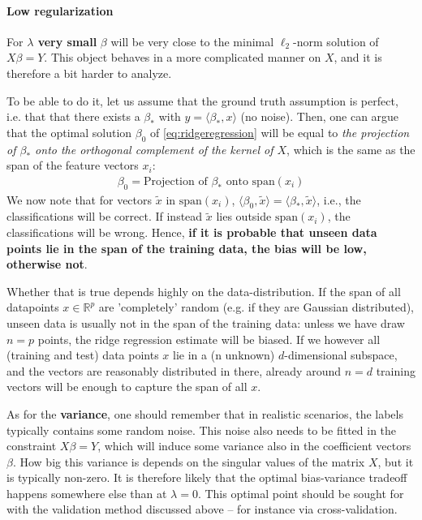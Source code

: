 \documentclass{article}
\newcommand{\sprod}[1]{\langle #1 \rangle}
\newcommand{\R}{\mathbb{R}}
\begin{document}
\paragraph{Low regularization} For \textbf{$\lambda$ very small} $\beta$ will be very close to the minimal $\ell_2$-norm solution of $X\beta = Y$. This object behaves in a more complicated manner on $X$, and it is therefore a bit harder to analyze.

To be able to do it, let us assume that the ground truth assumption is perfect, i.e. that that there exists a $\beta_*$ with $y=\sprod{\beta_*,x}$ (no noise). Then, one can argue that the optimal solution $\beta_0$ of \eqref{eq:ridgeregression} will be equal to \emph{the projection of $\beta_*$ onto the orthogonal complement of the kernel of $X$}, which is the same as the span of the feature vectors $x_i$:
\begin{align*}
    \beta_0 = \text{Projection of $\beta_*$ onto $\mathrm{span}(x_i)$}
\end{align*}
We now note that 
for vectors $\tilde{x}$ in $\mathrm{span}(x_i)$,  $\sprod{\beta_0,\tilde{x}}= \sprod{\beta_*,\tilde{x}}$, i.e., the classifications will be correct. If instead $\tilde{x}$ lies outside $\mathrm{span}(x_i)$, the classifications will be wrong. Hence, \textbf{if it is probable that unseen data points lie in the span of the training data, the bias will be low, otherwise not}. 

Whether that is true depends highly on the data-distribution. If the span of all datapoints $x \in \R^p$ are 'completely' random (e.g. if they are Gaussian distributed), unseen data is usually not in the span of the training data: unless we have draw $n=p$ points, the ridge regression estimate will be biased. If we however all (training and test) data points $x$ lie in a (n unknown) $d$-dimensional subspace, and the vectors are reasonably distributed in there, already around $n=d$ training vectors will be enough to capture the span of all $x$.

As for the \textbf{variance}, one should remember that in realistic scenarios, the labels typically contains some random noise. This noise also needs to be fitted in the constraint $X\beta=Y$, which will induce some variance also in the coefficient vectors $\beta$. How big this variance is depends on the singular values of the matrix $X$, but it is typically non-zero. It is therefore likely that the optimal bias-variance tradeoff happens somewhere else than at $\lambda=0$. This optimal point should be sought for with the validation method discussed above -- for instance via cross-validation. 
\end{document}
